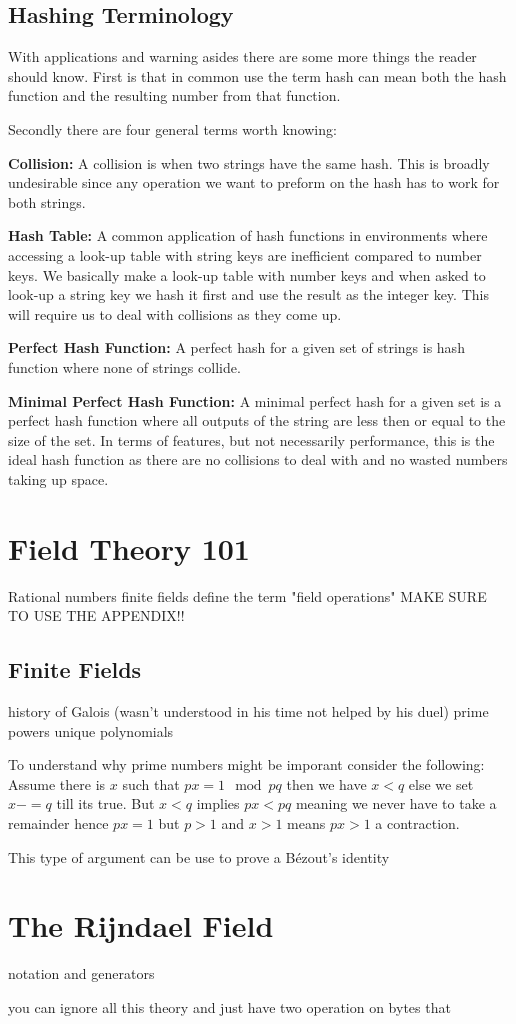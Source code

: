 \subsection{Hashing Terminology}
With applications and warning asides there are some more things the reader should know.
First is that in common use the term hash can mean both the hash function and the resulting number from that function.

Secondly there are four general terms worth knowing:

{\textbf{Collision:}} 
A collision is when two strings have the same hash.
This is broadly undesirable since any operation we want to preform on the hash has to work for both strings.

{\textbf{Hash Table:}}
A common application of hash functions in environments where accessing a look-up table with string keys are inefficient compared to number keys.
We basically make a look-up table with number keys and when asked to look-up a string key we hash it first and use the result as the integer key.
This will require us to deal with collisions as they come up.

{\textbf{Perfect Hash Function:}}
A perfect hash for a given set of strings is hash function where none of strings collide.

{\textbf{Minimal Perfect Hash Function:}}
A minimal perfect hash for a given set is a perfect hash function where all outputs of the string are less then or equal to the size of the set.
In terms of features,
but not necessarily performance,
this is the ideal hash function as there are no collisions to deal with and no wasted numbers taking up space.

\section{Field Theory 101}
Rational numbers
finite fields
define the term "field operations"
MAKE SURE TO USE THE APPENDIX!!

\subsection{Finite Fields}
history of Galois (wasn't understood in his time not helped by his duel)
prime powers
unique
polynomials

To understand why prime numbers might be imporant consider the following:
Assume there is $x$ such that $px=1 \mod pq$ then we have $x < q$ else we set $x -= q$ till its true.
But $x < q$ implies $px < pq$ meaning we never have to take a remainder hence $px = 1$ but $p>1$ and $x>1$ means $px> 1$ a contraction.

This type of argument can be use to prove a Bézout's identity

\section{The Rijndael Field}
notation and generators 

you can ignore all this theory and just have two operation on bytes that 
